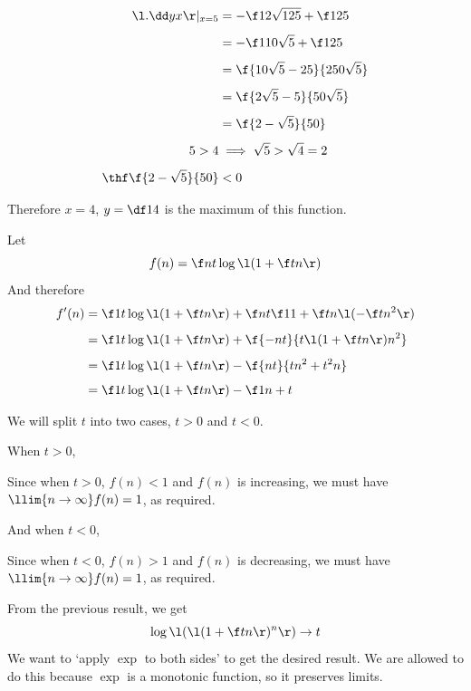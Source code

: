\documentclass[a4paper]{article}
\begin{document}
\begin{align*}
\l. \dd yx \r|_{x=5} &= -\f1{2 \sqrt{125}} + \f1{25}\\[1ex]
&= -\f1{10 \sqrt5} + \f1{25}\\[1ex]
&= \f{10 \sqrt5 - 25}{250 \sqrt 5}\\[1ex]
&= \f{2 \sqrt5 - 5}{50 \sqrt 5}\\[1ex]
&= \f{2 - \sqrt5}{50}\\[1ex]
5 > 4 &\implies \sqrt 5 > \sqrt 4 = 2\\[1ex]
\thf \f{2 - \sqrt5}{50} &< 0
\end{align*}

Therefore $x = 4$, $y = \df14$ is the maximum of this function.



Let $$f(n) = \f nt \log\l( 1 + \f tn \r)$$
And therefore \begin{align*}
f'(n) &= \f1t \log\l( 1 + \f tn \r) + \f nt \f1{1 + \f tn} \l(-\f t{n^2}\r)\\[1ex]
&= \f1t \log\l( 1 + \f tn \r) + \f{-nt}{t \l( 1 + \f tn \r) n^2}\\[1ex]
&= \f1t \log\l( 1 + \f tn \r) - \f{nt}{tn^2 + t^2n}\\[1ex]
&= \f1t \log\l( 1 + \f tn \r) - \f1{n + t}
\end{align*}

We will split $t$ into two cases, $t > 0$ and $t < 0$.

When $t > 0$,

Since when $t > 0$, $f(n) < 1$ and $f(n)$ is increasing, we must have $\llim{n \to \infty} f(n) = 1$, as required.

And when $t < 0$,

Since when $t < 0$, $f(n) > 1$ and $f(n)$ is decreasing, we must have $\llim{n \to \infty} f(n) = 1$, as required.

From the previous result, we get $$\log\l( \l( 1 + \f tn \r)^n \r) \to t$$
We want to \enquote*{apply $\exp$ to both sides} to get the desired result. We are allowed to do this because $\exp$ is a monotonic function, so it preserves limits.

\end{document}

